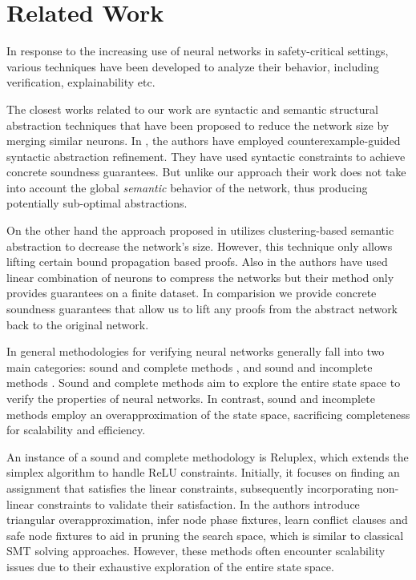 \section{Related Work}

In response to the increasing use of neural networks in safety-critical settings, 
various techniques have been developed to analyze their behavior, including 
verification, explainability etc. 

The closest works related to our work are 
syntactic and semantic structural abstraction techniques that
have been proposed to reduce the network size by merging similar neurons. 
In \cite {cegar-nn, cegarette}, the authors have 
employed counterexample-guided syntactic abstraction
refinement. They have used syntactic constraints to achieve concrete soundness 
guarantees. But unlike our approach their work does not take into account the global 
\textit{semantic} behavior of the network, thus producing potentially sub-optimal
abstractions.

On the other hand the approach proposed in \cite{deep-abstract} utilizes
clustering-based semantic abstraction to decrease the network's size. 
However, this technique only allows lifting certain bound propagation
based proofs. Also in \cite{lin-comb-abs-jan} the authors have used linear 
combination of neurons to compress the networks but their method only provides 
guarantees on a finite dataset. In comparision we provide concrete soundness
guarantees that allow us to lift any proofs from the abstract 
network back to the original network.

In general methodologies for verifying neural networks generally fall into two main
categories: sound and complete methods \cite{reluplex, formal-ver-piece-wise, 
comp-reachability-analysis, comp-milp, comp-out-range, comp-max-resilience, marabou,
comp-safety-ver-dnn, beta-crown, alpha-crown-bab-fnc, gcp-crown}, and sound and
incomplete methods \cite{deeppoly, crown, incomp-dual-approach, incomp-abs-inp, 
incomp-robustness-certi, incomp-boost-robustness}. Sound and complete methods aim to 
explore the entire state space to verify the properties of neural networks.
In contrast, sound and incomplete methods employ an overapproximation
of the state space, sacrificing completeness for 
scalability and efficiency.

An instance of a sound and complete methodology is Reluplex, which extends the 
simplex algorithm \cite{simplex} to 
handle ReLU constraints. Initially, it focuses on finding an assignment that 
satisfies the linear constraints, subsequently incorporating non-linear constraints 
to validate their satisfaction. In \cite{formal-ver-piece-wise}
the authors introduce triangular overapproximation, infer node phase fixtures,
learn conflict clauses and safe node fixtures to aid in pruning the search 
space, which is similar to classical SMT solving approaches. However, these methods
often encounter scalability issues due to their exhaustive exploration of the
entire state space. 

